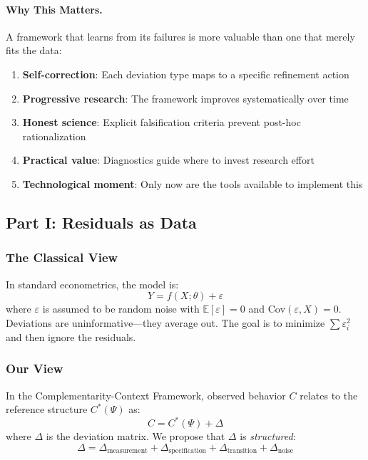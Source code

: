 \paragraph{Why This Matters.}
A framework that learns from its failures is more valuable than one that 
merely fits the data:
\begin{enumerate}
    \item \textbf{Self-correction}: Each deviation type maps to a specific refinement action
    \item \textbf{Progressive research}: The framework improves systematically over time
    \item \textbf{Honest science}: Explicit falsification criteria prevent post-hoc rationalization
    \item \textbf{Practical value}: Diagnostics guide where to invest research effort
    \item \textbf{Technological moment}: Only now are the tools available to implement this
\end{enumerate}

\subsection{Part I: Residuals as Data}

\subsubsection{The Classical View}

In standard econometrics, the model is:
\begin{equation}
Y = f(X; \theta) + \varepsilon
\end{equation}
where $\varepsilon$ is assumed to be random noise with $\mathbb{E}[\varepsilon] = 0$ 
and $\text{Cov}(\varepsilon, X) = 0$. Deviations are uninformative---they average out. 
The goal is to minimize $\sum \varepsilon_i^2$ and then ignore the residuals.

\subsubsection{Our View}

In the Complementarity-Context Framework, observed behavior $C$ relates to the 
reference structure $C^*(\Psi)$ as:
\begin{equation}
C = C^*(\Psi) + \Delta
\end{equation}
where $\Delta$ is the deviation matrix. We propose that $\Delta$ is \textit{structured}:
\begin{equation}
\Delta = \Delta_{\text{measurement}} + \Delta_{\text{specification}} + \Delta_{\text{transition}} + \Delta_{\text{noise}}
\end{equation}

